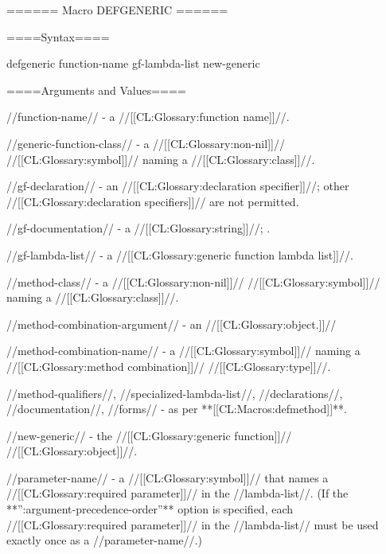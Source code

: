 ====== Macro DEFGENERIC ======


====Syntax====

\DefmacWithValuesNewline defgeneric {function-name gf-lambda-list } {new-generic}

 

====Arguments and Values====

//function-name// - a //[[CL:Glossary:function name]]//.

//generic-function-class// - a //[[CL:Glossary:non-nil]]// //[[CL:Glossary:symbol]]// naming a //[[CL:Glossary:class]]//.

//gf-declaration// - an  //[[CL:Glossary:declaration specifier]]//; other //[[CL:Glossary:declaration specifiers]]// are not permitted.

//gf-documentation// - a //[[CL:Glossary:string]]//; \noeval.

//gf-lambda-list// - a //[[CL:Glossary:generic function lambda list]]//.

//method-class// - a //[[CL:Glossary:non-nil]]// //[[CL:Glossary:symbol]]// naming a //[[CL:Glossary:class]]//.

//method-combination-argument// - an //[[CL:Glossary:object.]]//

//method-combination-name// - a //[[CL:Glossary:symbol]]// naming a //[[CL:Glossary:method combination]]// //[[CL:Glossary:type]]//.

//method-qualifiers//, //specialized-lambda-list//, //declarations//, //documentation//, //forms// - as per **[[CL:Macros:defmethod]]**.

//new-generic// - the //[[CL:Glossary:generic function]]// //[[CL:Glossary:object]]//.

//parameter-name// - a //[[CL:Glossary:symbol]]// that names a //[[CL:Glossary:required parameter]]// in the //lambda-list//. (If the **'':argument-precedence-order''** option is specified, each //[[CL:Glossary:required parameter]]// in the //lambda-list// must be used exactly once as a //parameter-name//.)

